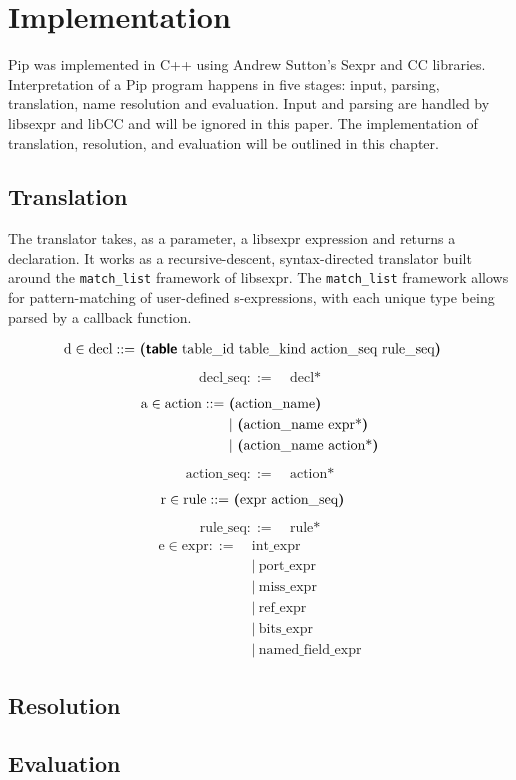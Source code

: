 \section{Implementation}

Pip was implemented in C++ using Andrew Sutton's Sexpr and CC libraries. Interpretation of a Pip program happens in five stages: input, parsing, translation, name resolution and evaluation. Input and parsing are handled by libsexpr and libCC and will be ignored in this paper. The implementation of translation, resolution, and evaluation will be outlined in this chapter.

\subsection{Translation}
The translator takes, as a parameter, a libsexpr expression and returns a declaration. It works as a recursive-descent, syntax-directed translator built around the \texttt{match\_list} framework of libsexpr. The \texttt{match\_list} framework allows for pattern-matching of user-defined s-expressions, with each unique type being parsed by a callback function.

\begin{align*} %
  \text{d} \in \text{decl} ::=~& \mathct{(table} \ \text{table\_id table\_kind action\_seq rule\_seq}\mathct{)}
\end{align*}
\begin{align*} %
  \text{decl\_seq} ::=~& \text{decl*}
\end{align*}
\begin{align*} %
  \text{a} \in \text{action} ::=~& \mathct{(}\text{action\_name}\mathct{)} \\
  & | \ \mathct{(}\text{action\_name expr*}\mathct{)} \\ 
  & | \ \mathct{(}\text{action\_name action*}\mathct{)}
\end{align*}
\begin{align*} %
  \text{action\_seq} ::=~& \text{action*}
\end{align*}
\begin{align*} %
  \text{r} \in \text{rule} ::=~& \mathct{(}\text{expr action\_seq}\mathct{)}
\end{align*}
\begin{align*} %
  \text{rule\_seq} ::=~& \text{rule*}
\end{align*}
\begin{align*} %
  \text{e} \in \text{expr} ::=~& \text{int\_expr} \\
  & | \ \text{port\_expr} \\
  & | \ \text{miss\_expr} \\
  & | \ \text{ref\_expr} \\
  & | \ \text{bits\_expr} \\
  & | \ \text{named\_field\_expr}
\end{align*}
           
\subsection{Resolution}
\subsection{Evaluation}
